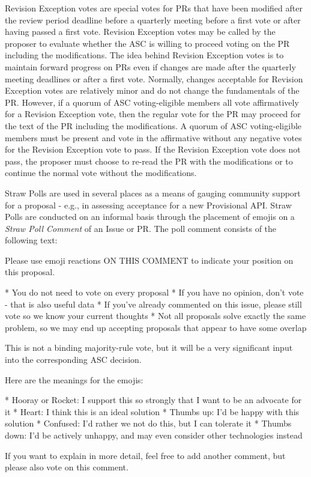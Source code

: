 \documentclass{article}
\newenvironment{Shaded}{\begin{snugshade}}{\end{snugshade}}
\newcommand{\BaseNTok}[1]{\textcolor[rgb]{0.00,0.00,0.81}{#1}}
\newcommand{\NormalTok}[1]{#1}
\begin{document}
Revision Exception votes are special votes for PRs that have been modified
after the review period deadline before a quarterly meeting 
before a first vote or after having passed a first
vote. Revision Exception votes may be called by the proposer to evaluate 
whether the ASC is willing to proceed voting on the PR including the 
modifications. 
The idea behind Revision Exception votes is to maintain forward progress on
PRs even if changes are made after the quarterly meeting deadlines or after
a first vote.
Normally, changes acceptable for Revision Exception votes
are relatively minor and do not change the fundamentals of the PR. However,
if a quorum of ASC voting-eligible members all vote affirmatively  
for a Revision Exception vote, then the regular vote 
for the PR may proceed for the text of the PR including the modifications. 
A quorum of ASC voting-eligible members must be present and vote in the affirmative 
without any negative votes for the Revision Exception vote to pass.
If the Revision Exception vote does not pass, 
the proposer must choose to re-read the PR with the modifications
or to continue the normal vote without the modifications.

Straw Polls are used in several places as a means of gauging
community support for a proposal - e.g., in assessing acceptance for a
new Provisional API. Straw Polls are conducted on an informal basis
through the placement of emojis on a \textit{Straw Poll Comment} of an Issue or PR.
The poll comment consists of the following text:

\begin{Shaded}
\begin{Highlighting}[]
\NormalTok{Please use emoji reactions ON THIS COMMENT to indicate your position on this proposal.}

\BaseNTok{    * You do not need to vote on every proposal}
\BaseNTok{    * If you have no opinion, don't vote - that is also useful data}
\BaseNTok{    * If you've already commented on this issue, please still vote so}
\BaseNTok{          we know your current thoughts}
\BaseNTok{    * Not all proposals solve exactly the same problem, so we may end}
\BaseNTok{          up accepting proposals that appear to have some overlap}

\NormalTok{This is not a binding majority-rule vote, but it will be a very}
\NormalTok{significant input into the corresponding ASC decision.}

\NormalTok{Here are the meanings for the emojis:}

\BaseNTok{    * Hooray or Rocket: I support this so strongly that I}
\BaseNTok{          want to be an advocate for it}
\BaseNTok{    * Heart: I think this is an ideal solution}
\BaseNTok{    * Thumbs up: I'd be happy with this solution}
\BaseNTok{    * Confused: I'd rather we not do this, but I can tolerate it}
\BaseNTok{    * Thumbs down: I'd be actively unhappy, and may even consider}
\BaseNTok{          other technologies instead}

\NormalTok{If you want to explain in more detail, feel free to add another}
\NormalTok{comment, but please also vote on this comment.}
\end{Highlighting}
\end{Shaded}
\end{document}

